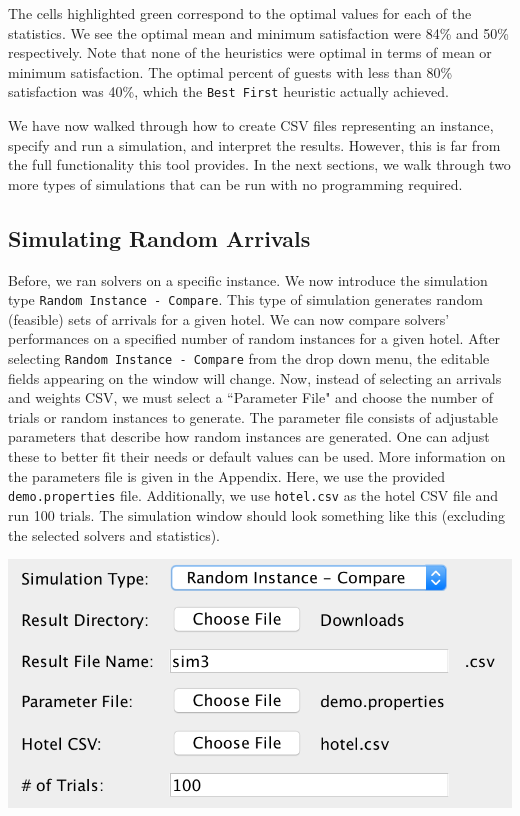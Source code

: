\documentclass[11 pt]{article}
\begin{document}
\vspace{-0.5cm}
\par The cells highlighted green correspond to the optimal values for each of the statistics. We see the optimal mean and minimum satisfaction were 84\% and 50\% respectively. Note that none of the heuristics were optimal in terms of mean or minimum satisfaction. The optimal percent of guests with less than 80\% satisfaction was 40\%, which the \texttt{Best First} heuristic actually achieved. 
\par We have now walked through how to create CSV files representing an instance, specify and run a simulation, and interpret the results. However, this is far from the full functionality this tool provides. In the next sections, we walk through two more types of simulations that can be run with no programming required.
\subsection{Simulating Random Arrivals}
\par Before, we ran solvers on a specific instance. We now introduce the simulation type \texttt{Random Instance - Compare}. This type of simulation generates random (feasible) sets of arrivals for a given hotel. We can now compare solvers' performances on a specified number of random instances for a given hotel. After selecting \texttt{Random Instance - Compare} from the drop down menu, the editable fields appearing on the window will change. Now, instead of selecting an arrivals and weights CSV, we must select a ``Parameter File" and choose the number of trials or random instances to generate. The parameter file consists of adjustable parameters that describe how random instances are generated. One can adjust these to better fit their needs or default values can be used. More information on the parameters file is given in the Appendix. Here, we use the provided \texttt{demo.properties} file. Additionally, we use \texttt{hotel.csv} as the hotel CSV file and run 100 trials. The simulation window should look something like this (excluding the selected solvers and statistics).
\begin{center}
\includegraphics[scale=0.55]{images/sim3Screen.png}
\end{center}
\end{document}
